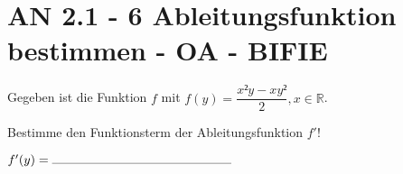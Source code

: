 \section{AN 2.1 - 6 Ableitungsfunktion bestimmen - OA - BIFIE}

\begin{beispiel}[AN 2.1]{1} %
				Gegeben ist die Funktion $f$ mit $f(y)=\dfrac{x²y-xy²}{2},x\in\mathbb{R}$.

Bestimme den Funktionsterm der Ableitungsfunktion $f'$!
\leer

$f'(y)=\rule{5cm}{0.3pt}$
\leer

\end{beispiel}